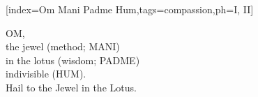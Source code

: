 %
\setcounter{songnum}{470}


[index={Om Mani Padme Hum},tags={compassion},ph={I, II}]
  \vspace{1em}
  {\small{}}
  \vspace{-2em}
  \begin{feeler}
    OM,\\
    the jewel (method; MANI)\\
    in the lotus (wisdom; PADME)\\
    indivisible (HUM).\\\vspace{1em}
    Hail to the Jewel in the Lotus.
  \end{feeler}
